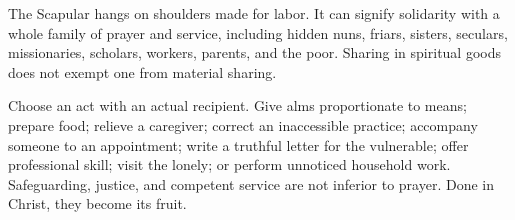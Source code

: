 The Scapular hangs on shoulders made for labor. It can signify solidarity with a whole family of prayer and service, including hidden nuns, friars, sisters, seculars, missionaries, scholars, workers, parents, and the poor. Sharing in spiritual goods does not exempt one from material sharing.

Choose an act with an actual recipient. Give alms proportionate to means; prepare food; relieve a caregiver; correct an inaccessible practice; accompany someone to an appointment; write a truthful letter for the vulnerable; offer professional skill; visit the lonely; or perform unnoticed household work. Safeguarding, justice, and competent service are not inferior to prayer. Done in Christ, they become its fruit.




